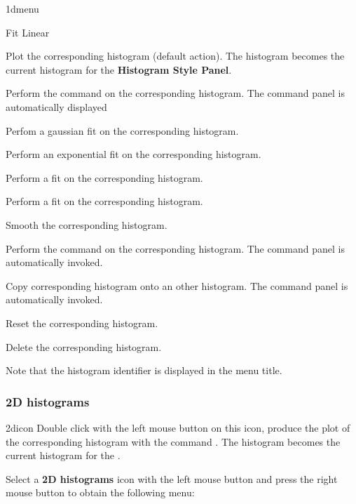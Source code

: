 \begin{PAWf}[.25]{1dmenu}
\begin{DLsf}{Fit Linear}
\item[Plot]         Plot the corresponding histogram (default action). The
                    histogram becomes the current histogram for the 
                    {\bf Histogram Style Panel}.
\item[Fit...]       Perform the command  on the corresponding
                    histogram. The command panel is automatically displayed
\item[Fit Gauss]    Perfom a gaussian fit on the corresponding histogram.
\item[Fit Exp]      Perform an exponential fit on the corresponding histogram.
\item[Fit Const]    Perform a  fit on the corresponding histogram.
\item[Fit Linear]   Perform a  fit on the corresponding histogram.
\item[Smooth]       Smooth the corresponding histogram.
\item[Smooth...]    Perform the command  on the corresponding
                    histogram. The command panel is automatically invoked.
\item[Copy ]        Copy corresponding histogram onto an other histogram.
                    The command panel is automatically invoked.
\item[Reset ]       Reset the corresponding histogram.
\item[Delete]       Delete the corresponding histogram.
\end{DLsf}
\end{PAWf}

Note that the histogram identifier is displayed in the menu title.


\subsubsection{2D histograms}
\begin{ICON}{2dicon}
Double click with the left mouse button on this icon, produce the plot of the
corresponding histogram with the command  . The histogram
becomes the current histogram for the \HSP.
\end{ICON}

Select a {\bf 2D histograms} icon with the left mouse button and press
the right mouse button to obtain the following menu:

